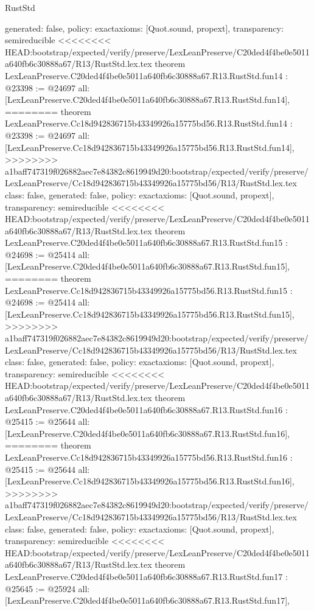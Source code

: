 \begin{lexlean}{RustStd}
\begin{coremodule}
{\begin{coremodule}
{{{{{{{{{{{{{{{{{  generated: false,
  policy: exact{axioms: [Quot.sound, propext]},
  transparency: semireducible
}
<<<<<<<< HEAD:bootstrap/expected/verify/preserve/LexLeanPreserve/C20ded4f4be0e5011a640fb6c30888a67/R13/RustStd.lex.tex
theorem LexLeanPreserve.C20ded4f4be0e5011a640fb6c30888a67.R13.RustStd.fun14 : @23398 := @24697 {
  all: [LexLeanPreserve.C20ded4f4be0e5011a640fb6c30888a67.R13.RustStd.fun14],
========
theorem LexLeanPreserve.Cc18d942836715b43349926a15775bd56.R13.RustStd.fun14 : @23398 := @24697 {
  all: [LexLeanPreserve.Cc18d942836715b43349926a15775bd56.R13.RustStd.fun14],
>>>>>>>> a1baff747319f026882aec7e84382c8619949d20:bootstrap/expected/verify/preserve/LexLeanPreserve/Cc18d942836715b43349926a15775bd56/R13/RustStd.lex.tex
  class: false,
  generated: false,
  policy: exact{axioms: [Quot.sound, propext]},
  transparency: semireducible
}
<<<<<<<< HEAD:bootstrap/expected/verify/preserve/LexLeanPreserve/C20ded4f4be0e5011a640fb6c30888a67/R13/RustStd.lex.tex
theorem LexLeanPreserve.C20ded4f4be0e5011a640fb6c30888a67.R13.RustStd.fun15 : @24698 := @25414 {
  all: [LexLeanPreserve.C20ded4f4be0e5011a640fb6c30888a67.R13.RustStd.fun15],
========
theorem LexLeanPreserve.Cc18d942836715b43349926a15775bd56.R13.RustStd.fun15 : @24698 := @25414 {
  all: [LexLeanPreserve.Cc18d942836715b43349926a15775bd56.R13.RustStd.fun15],
>>>>>>>> a1baff747319f026882aec7e84382c8619949d20:bootstrap/expected/verify/preserve/LexLeanPreserve/Cc18d942836715b43349926a15775bd56/R13/RustStd.lex.tex
  class: false,
  generated: false,
  policy: exact{axioms: [Quot.sound, propext]},
  transparency: semireducible
}
<<<<<<<< HEAD:bootstrap/expected/verify/preserve/LexLeanPreserve/C20ded4f4be0e5011a640fb6c30888a67/R13/RustStd.lex.tex
theorem LexLeanPreserve.C20ded4f4be0e5011a640fb6c30888a67.R13.RustStd.fun16 : @25415 := @25644 {
  all: [LexLeanPreserve.C20ded4f4be0e5011a640fb6c30888a67.R13.RustStd.fun16],
========
theorem LexLeanPreserve.Cc18d942836715b43349926a15775bd56.R13.RustStd.fun16 : @25415 := @25644 {
  all: [LexLeanPreserve.Cc18d942836715b43349926a15775bd56.R13.RustStd.fun16],
>>>>>>>> a1baff747319f026882aec7e84382c8619949d20:bootstrap/expected/verify/preserve/LexLeanPreserve/Cc18d942836715b43349926a15775bd56/R13/RustStd.lex.tex
  class: false,
  generated: false,
  policy: exact{axioms: [Quot.sound, propext]},
  transparency: semireducible
}
<<<<<<<< HEAD:bootstrap/expected/verify/preserve/LexLeanPreserve/C20ded4f4be0e5011a640fb6c30888a67/R13/RustStd.lex.tex
theorem LexLeanPreserve.C20ded4f4be0e5011a640fb6c30888a67.R13.RustStd.fun17 : @25645 := @25924 {
  all: [LexLeanPreserve.C20ded4f4be0e5011a640fb6c30888a67.R13.RustStd.fun17],
}}}}}}}}}}}}}}}}}}}}
\end{coremodule}}
\end{coremodule}
\end{lexlean}
